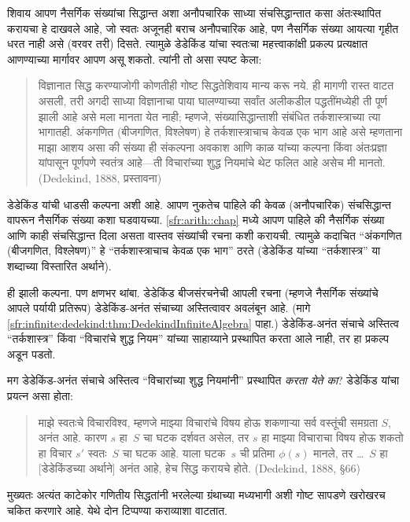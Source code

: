 \documentclass[11pt,a4paper,openany]{book}
\theoremstyle{definition}
\begin{document}
 शिवाय आपण नैसर्गिक संख्यांचा सिद्धान्त अशा अनौपचारिक साध्या
 संचसिद्धान्तात कसा अंतःस्थापित करायचा हे दाखवले आहे, जो स्वतः अजूनही
 बराच अनौपचारिक आहे, पण नैसर्गिक संख्या आयत्या गृहीत धरत नाही असे
 (वरवर तरी) दिसते. त्यामुळे डेडेकिंड यांचा स्वतःचा महत्त्वाकांक्षी
 प्रकल्प प्रत्यक्षात आणण्याच्या मार्गावर आपण असू शकतो. त्यांनी तो असा
 स्पष्ट केला:
\begin{quote}
	विज्ञानात सिद्ध करण्याजोगी कोणतीही गोष्ट सिद्धतेशिवाय मान्य करू नये.
	ही मागणी रास्त वाटत असली, तरी अगदी साध्या विज्ञानाचा पाया घालण्याच्या
	सर्वांत अलीकडील पद्धतींमध्येही ती पूर्ण झाली आहे असे मला मानता येत
	नाही; म्हणजे, संख्यासिद्धान्ताशी संबंधित तर्कशास्त्राच्या त्या भागातही.
	अंकगणित (बीजगणित, विश्लेषण) हे तर्कशास्त्राचाच केवळ एक भाग आहे असे
	म्हणताना माझा आशय असा की संख्या ही संकल्पना अवकाश आणि काळ यांच्या
	कल्पना किंवा अंतःप्रज्ञा यांपासून पूर्णपणे स्वतंत्र आहे---ती विचारांच्या
	शुद्ध नियमांचे थेट फलित आहे असेच मी मानतो.
	(Dedekind, 1888, प्रस्तावना)
\end{quote}
डेडेकिंड यांची धाडसी कल्पना अशी आहे. आपण नुकतेच पाहिले की केवळ
(अनौपचारिक) संचसिद्धान्त वापरून नैसर्गिक संख्या कशा घडवायच्या.
\ref{sfr:arith::chap} मध्ये आपण पाहिले की नैसर्गिक संख्या आणि काही
संचसिद्धान्त दिला असता वास्तव संख्यांची रचना कशी करायची. त्यामुळे कदाचित
``अंकगणित (बीजगणित, विश्लेषण)'' हे ``तर्कशास्त्राचाच केवळ एक भाग'' ठरते
(डेडेकिंड यांच्या ``तर्कशास्त्र'' या शब्दाच्या विस्तारित अर्थाने).

ही झाली कल्पना. पण क्षणभर थांबा. डेडेकिंड बीजसंरचनेची आपली रचना
(म्हणजे नैसर्गिक संख्यांचे आपले पर्यायी प्रतिरूप) डेडेकिंड-अनंत संचाच्या
अस्तित्वावर अवलंबून आहे. (मागे \ref{sfr:infinite:dedekind:thm:DedekindInfiniteAlgebra}
पाहा.) डेडेकिंड-अनंत संचाचे अस्तित्व ``तर्कशास्त्र'' किंवा ``विचारांचे
शुद्ध नियम'' यांच्या साहाय्याने प्रस्थापित करता आले नाही, तर हा प्रकल्प
अडून पडतो.

मग डेडेकिंड-अनंत संचाचे अस्तित्व ``विचारांच्या शुद्ध नियमांनी''
प्रस्थापित \emph{करता येते का}? डेडेकिंड यांचा प्रयत्न असा होता:
\begin{quote}
  माझे स्वतःचे विचारविश्व, म्हणजे माझ्या विचारांचे विषय होऊ शकणाऱ्या सर्व
  वस्तूंची समग्रता $S$, अनंत आहे. कारण $s$ हा~$S$ चा घटक दर्शवत असेल,
  तर $s$ हा माझ्या विचाराचा विषय होऊ शकतो हा विचार $s'$ स्वतः~$S$ चा
  घटक आहे. याला घटक~$s$ ची प्रतिमा $\phi(s)$ मानले, तर
  \dots~$S$ हा [डेडेकिंडच्या अर्थाने] अनंत आहे, हेच सिद्ध करायचे होते.
	(Dedekind, 1888, \S66)
\end{quote}
मुख्यतः अत्यंत काटेकोर गणितीय सिद्धतांनी भरलेल्या ग्रंथाच्या मध्यभागी
अशी गोष्ट सापडणे खरोखरच चकित करणारे आहे. येथे दोन टिप्पण्या कराव्याशा
वाटतात.
\end{document}
